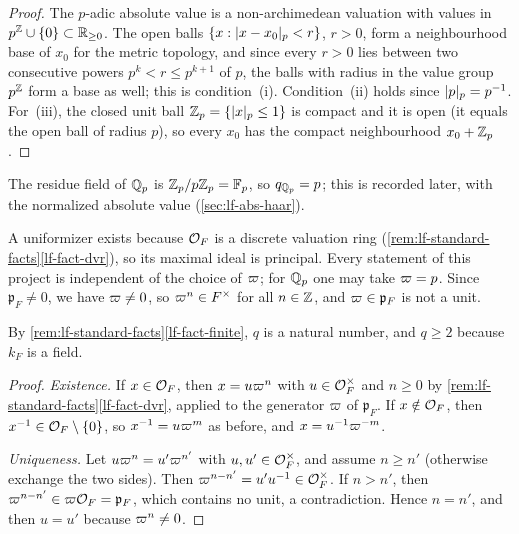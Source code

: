 \begin{definition}
\end{definition}
\begin{proof}
The $p$-adic absolute value is a non-archimedean valuation with values in $p^{\mathbb{Z}}\cup\{0\}\subset\mathbb{R}_{\ge0}$. The open
balls $\{x:\lvert x-x_0\rvert_p<r\}$, $r>0$, form a neighbourhood base of $x_0$ for the metric topology, and since every
$r>0$ lies between two consecutive powers $p^{k}<r\le p^{k+1}$ of $p$, the balls with radius in the value group
$p^{\mathbb{Z}}$ form a base as well; this is condition~(i). Condition~(ii) holds since $\lvert p\rvert_p=p^{-1}$. For~(iii), the
closed unit ball $\mathbb{Z}_p=\{\lvert x\rvert_p\le1\}$ is compact and it is open (it equals the open ball of radius $p$), so every
$x_0$ has the compact neighbourhood $x_0+\mathbb{Z}_p$.
\end{proof}
\noindent The residue field of $\mathbb{Q}_p$ is $\mathbb{Z}_p/p\mathbb{Z}_p=\mathbb F_p$, so $q_{\mathbb{Q}_p}=p$; this is recorded later, with the
normalized absolute value (\cref{sec:lf-abs-haar}).

\begin{definition}[uniformizer]
\end{definition}
\noindent A uniformizer exists because $\mathcal{O}_F$ is a discrete valuation ring
(\cref{rem:lf-standard-facts}\ref{lf-fact-dvr}), so its maximal ideal is principal. Every statement of this project
is independent of the choice of $\varpi$; for $\mathbb{Q}_p$ one may take $\varpi=p$. Since $\mathfrak p_F\neq0$, we have
$\varpi\neq0$, so $\varpi^n\in F^\times$ for all $n\in\mathbb{Z}$, and $\varpi\in\mathfrak p_F$ is not a unit.

\begin{definition}
\end{definition}
\noindent By \cref{rem:lf-standard-facts}\ref{lf-fact-finite}, $q$ is a natural number, and $q\ge2$ because
$k_F$ is a field.

\begin{theorem}
\end{theorem}
\begin{proof}
\emph{Existence.} If $x\in\mathcal{O}_F$, then $x=u\varpi^n$ with $u\in\mathcal{O}_F^\times$ and $n\ge0$ by
\cref{rem:lf-standard-facts}\ref{lf-fact-dvr}, applied to the generator $\varpi$ of $\mathfrak p_F$. If
$x\notin\mathcal{O}_F$, then $x^{-1}\in\mathcal{O}_F\setminus\{0\}$, so $x^{-1}=u\varpi^{m}$ as before, and
$x=u^{-1}\varpi^{-m}$.

\emph{Uniqueness.} Let $u\varpi^n=u'\varpi^{n'}$ with $u,u'\in\mathcal{O}_F^\times$, and assume $n\ge n'$ (otherwise
exchange the two sides). Then $\varpi^{n-n'}=u'u^{-1}\in\mathcal{O}_F^\times$. If $n>n'$, then
$\varpi^{n-n'}\in\varpi\mathcal{O}_F=\mathfrak p_F$, which contains no unit, a contradiction. Hence $n=n'$, and then
$u=u'$ because $\varpi^n\neq0$.
\end{proof}

